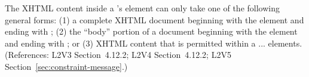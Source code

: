The XHTML content inside a \Constraint's  element can only
take one of the following general forms: (1) a complete XHTML document
beginning with the element  and ending with ;
(2) the ``body'' portion of a document beginning with the element
 and ending with ; or (3) XHTML content that
is permitted within a  ...  elements.
(References: L2V3 Section~4.12.2; L2V4 Section~4.12.2; L2V5 Section~\ref{sec:constraint-message}.)
